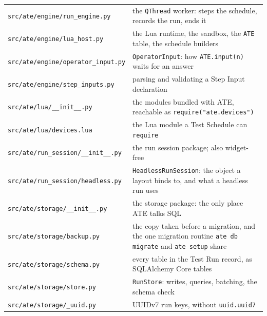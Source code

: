 \begin{longtable}{p{5.6cm} p{9.4cm}}
\texttt{src/\allowbreak{}ate/\allowbreak{}engine/\allowbreak{}run\_\allowbreak{}engine.py} & the \texttt{QThread} worker: steps the schedule, records the run, ends it \\
\texttt{src/\allowbreak{}ate/\allowbreak{}engine/\allowbreak{}lua\_\allowbreak{}host.py} & the Lua runtime, the sandbox, the \texttt{ATE} table, the schedule builders \\
\texttt{src/\allowbreak{}ate/\allowbreak{}engine/\allowbreak{}operator\_\allowbreak{}input.py} & \texttt{OperatorInput}: how \texttt{ATE.input(n)} waits for an answer \\
\texttt{src/\allowbreak{}ate/\allowbreak{}engine/\allowbreak{}step\_\allowbreak{}inputs.py} & parsing and validating a Step Input declaration \\
\texttt{src/\allowbreak{}ate/\allowbreak{}lua/\allowbreak\_\allowbreak\_\allowbreak{}init\_\allowbreak\_\allowbreak.py} & the modules bundled with ATE, reachable as \texttt{require("ate.devices")} \\
\texttt{src/\allowbreak{}ate/\allowbreak{}lua/\allowbreak{}devices.lua} & the Lua module a Test Schedule can \texttt{require} \\
\texttt{src/\allowbreak{}ate/\allowbreak{}run\_\allowbreak{}session/\allowbreak\_\allowbreak\_\allowbreak{}init\_\allowbreak\_\allowbreak.py} & the run session package; also widget-free \\
\texttt{src/\allowbreak{}ate/\allowbreak{}run\_\allowbreak{}session/\allowbreak{}headless.py} & \texttt{HeadlessRunSession}: the object a layout binds to, and what a headless run uses \\
\texttt{src/\allowbreak{}ate/\allowbreak{}storage/\allowbreak\_\allowbreak\_\allowbreak{}init\_\allowbreak\_\allowbreak.py} & the storage package: the only place ATE talks SQL \\
\texttt{src/\allowbreak{}ate/\allowbreak{}storage/\allowbreak{}backup.py} & the copy taken before a migration, and the one migration routine \texttt{ate db migrate} and \texttt{ate setup} share \\
\texttt{src/\allowbreak{}ate/\allowbreak{}storage/\allowbreak{}schema.py} & every table in the Test Run record, as SQLAlchemy Core tables \\
\texttt{src/\allowbreak{}ate/\allowbreak{}storage/\allowbreak{}store.py} & \texttt{RunStore}: writes, queries, batching, the schema check \\
\texttt{src/\allowbreak{}ate/\allowbreak{}storage/\allowbreak\_\allowbreak{}uuid.py} & UUIDv7 run keys, without \texttt{uuid.uuid7} \\

\end{longtable}
